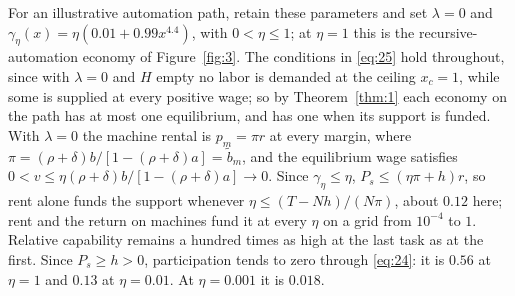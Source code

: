 \documentclass[12pt]{article}
\theoremstyle{plain}
\theoremstyle{definition}
\theoremstyle{remark}
\begin{document}
For an illustrative automation path, retain these parameters and set $\lambda=0$ and $\gamma_\eta(x)=\eta(0.01+0.99x^{4.4})$, with $0<\eta\le1$; at $\eta=1$ this is the recursive-automation economy of Figure~\ref{fig:3}.
The conditions in \eqref{eq:25} hold throughout, since with $\lambda=0$ and $H$ empty no labor is demanded at the ceiling $x_c=1$, while some is supplied at every positive wage; so by Theorem~\ref{thm:1} each economy on the path has at most one equilibrium, and has one when its support is funded.
With $\lambda=0$ the machine rental is $p_m=\pi r$ at every margin, where $\pi=(\rho+\delta)b/[1-(\rho+\delta)a]=\widetilde b_m$, and the equilibrium wage satisfies $0<v\le\eta(\rho+\delta)b/[1-(\rho+\delta)a]\to0$.
Since $\gamma_\eta\le\eta$, $P_s\le(\eta\pi+h)r$, so rent alone funds the support whenever $\eta\le(T-Nh)/(N\pi)$, about $0.12$ here; rent and the return on machines fund it at every $\eta$ on a grid from $10^{-4}$ to $1$.
Relative capability remains a hundred times as high at the last task as at the first. Since $P_s\ge h>0$, participation tends to zero through \eqref{eq:24}: it is $0.56$ at $\eta=1$ and $0.13$ at $\eta=0.01$.
At $\eta=0.001$ it is $0.018$.
\end{document}
